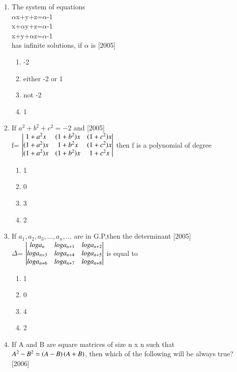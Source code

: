 \documentclass[journal,12pt,twocolumn]{IEEEtran}
\theoremstyle{remark}
\begin{document}
\begin{enumerate}
\begin{enumerate}[label=\alph*)]
\end{enumerate}
\item The system of equations \\
$\alpha$x+y+z=$\alpha$-1 \\
x+$\alpha$y+z=$\alpha$-1 \\
x+y+$\alpha$z=$\alpha$-1 \\
has infinite solutions, if $\alpha$ is \hfill{[2005]}
\begin{enumerate}[label=\alph*)]
    \item -2
    \item either -2 or 1
    \item not -2
    \item 1 \\
\end{enumerate}
\item If $a^2+b^2+c^2=-2$ and \hfill{[2005]} \\
	f= $\begin{vmatrix}
    1+a^2x & (1+b^2)x & (1+c^2)x \\
    (1+a^2)x & 1+b^2x & (1+c^2)x \\
    (1+a^2)x & (1+b^2)x & 1+c^2x\end{vmatrix}$ then f is a polynomial of degree
\begin{enumerate}[label=\alph*)]
    \item 1
    \item 0
    \item 3
    \item 2 \\
\end{enumerate}
\item If $a_1,a_2,a_3,\dots,a_n,\dots$ are in G.P,then the determinant \hfill{[2005]} \\
	$\Delta$= $\begin{vmatrix} 
	loga_n & loga_{n+1} & loga_{n+2} \\
	loga_{n+3} & loga_{n+4} & loga_{n+5} \\
	loga_{n+6} & loga_{n+7} & loga_{n+8}\end{vmatrix}$ is equal to \\
\begin{enumerate}[label=\alph*)]
    \item 1
    \item 0
    \item 4
    \item 2 \\
\end{enumerate}
\item If A and B are square matrices of size n x n such that $A^2-B^2=\left(A-B\right)\left(A+B\right)$, then which of the following will be always true? \hfill{[2006]}

\end{enumerate}
\end{document}
